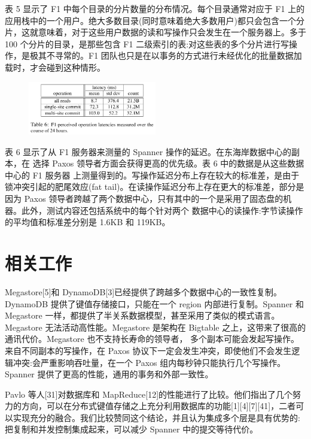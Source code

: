 \documentclass[letterpaper,twocolumn,10pt]{article}
\begin{document}
表 5 显示了 F1 中每个目录的分片数量的分布情况。每个目录通常对应于 F1 上的应用栈中的一个用户。绝大多数目录(同时意味着绝大多数用户)都只会包含一个分片，这就意味着，对于这些用户数据的读和写操作只会发生在一个服务器上。多于 100 个分片的目录，是那些包含 F1 二级索引的表:对这些表的多个分片进行写操作，是极其不寻常的。F1 团队也只是在以事务的方式进行未经优化的批量数据加载时，才会碰到这种情形。

\begin{figure}[htbp]
\begin{center}
\includegraphics[width=0.5\textwidth]{./table_6.png}
\label{Table6}
\end{center}
\end{figure}


表 6 显示了从 F1 服务器来测量的 Spanner 操作的延迟。在东海岸数据中心的副本，在 选择 Paxos 领导者方面会获得更高的优先级。表 6 中的数据是从这些数据中心的 F1 服务器 上测量得到的。写操作延迟分布上存在较大的标准差，是由于锁冲突引起的肥尾效应(fat tail)。在读操作延迟分布上存在更大的标准差，部分是因为 Paxos 领导者跨越了两个数据中心，只有其中的一个是采用了固态盘的机器。此外，测试内容还包括系统中的每个针对两个 数据中心的读操作:字节读操作的平均值和标准差分别是 1.6KB 和 119KB。

\section{相关工作}

Megastore[5]和 DynamoDB[3]已经提供了跨越多个数据中心的一致性复制。DynamoDB 提供了键值存储接口，只能在一个 region 内部进行复制。Spanner 和 Megastore 一样，都提供了半关系数据模型，甚至采用了类似的模式语言。Megastore 无法活动高性能。Megastore 是架构在 Bigtable 之上，这带来了很高的通讯代价。Megastore 也不支持长寿命的领导者， 多个副本可能会发起写操作。来自不同副本的写操作，在 Paxos 协议下一定会发生冲突，即使他们不会发生逻辑冲突:会严重影响吞吐量，在一个 Paxos 组内每秒钟只能执行几个写操作。Spanner 提供了更高的性能，通用的事务和外部一致性。

Pavlo 等人[31]对数据库和 MapReduce[12]的性能进行了比较。他们指出了几个努力的方向，可以在分布式键值存储之上充分利用数据库的功能[1][4][7][41]，二者可以实现充分的融合。我们比较赞同这个结论，并且认为集成多个层是具有优势的:把复制和并发控制集成起来，可以减少 Spanner 中的提交等待代价。
\end{document}
